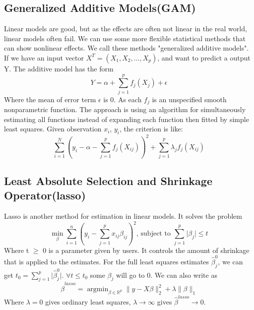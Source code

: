 \documentclass[11pt]{article}
\DeclareMathOperator*{\argminB}{argmin}   %
\begin{document}
\subsection{Generalized Additive Models(GAM)}  
Linear models are good, but as the effects are often not linear in the real world, linear models often fail. We can use some more flexible statistical methods that can show nonlinear effects. We call these methods "generalized additive models". If we have an input vector $X^T=(X_1,X_2,...,X_p)$, and want to predict a output Y. The additive model has the form $$Y=\alpha+\sum_{j=1}^{p} f_j(X_j)+\epsilon$$
Where the mean of error term $\epsilon$ is 0. As each $f_j$ is an unspecified smooth nonparametric function. The approach is using an algorithm for simultaneously estimating all functions instead of expanding each function then fitted by simple least squares. Given observation $x_i$, $y_i$, the criterion is like: $$\sum_{i=1}^{N} (y_i-\alpha-\sum_{j=1}^{p}f_j(X_{ij}))^2+\sum_{j=1}^{p} \lambda_jf_j(X_{ij})$$

\subsection{Least Absolute Selection and Shrinkage Operator(lasso)}  
Lasso is another method for estimation in linear models. It solves the problem $$\min_{\beta} \sum_{i=1}^{n} (y_i-\sum_{j=1}^{p} x_{ij}\beta_{ij})^2 \text{, subject to } \sum_{j=1}^{p} \lvert \beta_j \rvert \leq t$$
Where t $\geq$ 0 is a parameter given by users. It controls the amount of shrinkage that is applied to the estimates. For the full least squares estimates $\hat{\beta}^0_j$, we can get $t_0=\sum_{j=1}^{p} \lvert \hat{\beta}^0_j \rvert$. $\forall t \leq t_0$ some $\beta_j$ will go to 0. We can also write as $$\hat\beta^{lasso}=\argminB_{\beta \in \mathbb{R}^p} \lVert y-X\beta\rVert^2_2+\lambda\lVert \beta \rVert_1$$
Where $\lambda=0$ gives ordinary least squares, $\lambda\to\infty$ gives $\hat\beta^{lasso}\to0$. 
\end{document}
